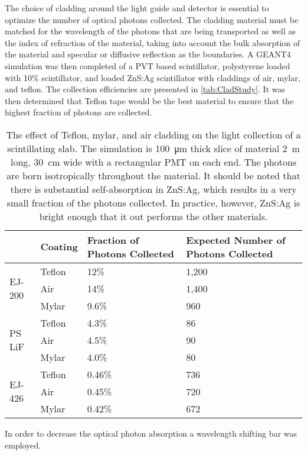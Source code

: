 The choice of cladding around the light guide and detector is essential to optimize the number of optical photons collected.
The cladding material must be matched for the wavelength of the photons that are being transported as well as the index of refraction of the material, taking into account the bulk absorption of the material and specular or diffusive reflection as the boundaries.
A GEANT4 simulation was then completed of a PVT based scintillator, polystyrene loaded with 10\%  scintillator, and  loaded ZnS:Ag scintillator with claddings of air, mylar, and teflon.
The collection efficiencies are presented in \autoref{tab:CladStudy}.
It was then determined that Teflon tape would be the best material to ensure that the highest fraction of photons are collected.
\begin{table}
  \caption[Teflon, Mylar, and HDPE Cladding Light Collection Effect]{The effect of Teflon, mylar, and air cladding on the light collection of a scintillating slab. The simulation is \SI{100}{\um} thick slice of material \SI{2}{\m} long, \SI{30}{\cm} wide with a rectangular PMT on each end. The photons are born isotropically throughout the material. It should be noted that there is substantial self-absorption in ZnS:Ag, which results in a very small fraction of the photons collected. In practice, however, ZnS:Ag is bright enough that it out performs the other materials.}
  \label{tab:CladStudy}
  \begin{tabular}{p{3cm} m{3cm} m{3cm} m{3cm}}
  \toprule
  & Coating & Fraction of Photons Collected & Expected Number of Photons Collected \\
  \midrule 
  \multirow{3}{*}{EJ-200} & Teflon & 12\% & 1,200\\
  				      & Air &  14\% & 1,400\\
				      & Mylar & 9.6\% & 960\\
  \midrule 
  \multirow{3}{*}{PS LiF} & Teflon & 4.3\% & 86\\
  				      & Air & 4.5\% & 90\\
				      & Mylar & 4.0\% & 80\\
  \midrule 
  \multirow{3}{*}{EJ-426} & Teflon & 0.46\% &736\\
  				      & Air & 0.45\% & 720\\
				      & Mylar & 0.42\% & 672 \\
 \bottomrule				 	   				  
 \end{tabular}
\end{table}
In order to decrease the optical photon absorption a wavelength shifting bar was employed.

